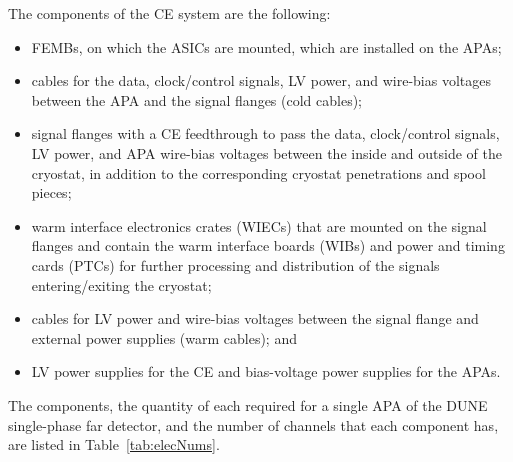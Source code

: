 The components of the CE system are the following:
\begin{itemize}
\item{FEMBs, on which the ASICs are mounted, which are installed on the APAs;}
\item{cables for the data, clock/control signals, LV power, and wire-bias voltages between the APA and the signal flanges (cold cables);}
\item{signal flanges with a CE feedthrough to pass the data, clock/control signals, LV power, and APA wire-bias voltages between the inside and outside of the cryostat, in addition to the corresponding cryostat penetrations and spool pieces;}
\item{warm interface electronics crates (WIECs) that are mounted on the signal flanges and contain
the warm interface boards (WIBs) and power and timing cards (PTCs) for further processing
and distribution of the signals entering/exiting the cryostat;}
\item{cables for LV power and wire-bias voltages between the signal flange and external power
supplies (warm cables); and}
\item{LV power supplies for the CE and bias-voltage power supplies for the APAs.}
\end{itemize}

The components, the quantity of each required for a single APA of the DUNE single-phase far detector, and the number of channels that each component has, are listed in Table~\ref{tab:elecNums}.

